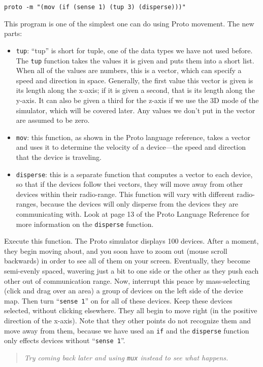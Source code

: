 \documentclass{article}
\newcommand\code[1]{\begin{center}\var{#1}\end{center}}
\newcommand\problem[1]{\begin{quote}{\em #1}\end{quote}}
\newcommand\var[1]{{\tt #1}}
\newcommand\qvar[1]{``{\tt #1}''}
\begin{document}
\code{proto -m "(mov (if (sense 1) (tup 3) (disperse)))"}

This program is one of the simplest one can do using Proto
movement. The new parts:
\begin{itemize}
\item \var{tup}: ``tup'' is short for tuple, one of the data types we
  have not used before.  The \var{tup} function takes the values it is
  given and puts them into a short list.  When all of the values are
  numbers, this is a vector, which can specify a speed and
  direction in space.  Generally, the first value this vector is given
  is its length along the x-axis; if it is given a second, that is its
  length along the y-axis.  It can also be given a third for the
  z-axis if we use the 3D mode of the simulator, which will be covered
  later.  Any values we don't put in the vector are assumed to be
  zero.
\item \var{mov}: this function, as shown in the Proto language
  reference, takes a vector and uses it to determine the velocity of a
  device---the speed and direction that the device is traveling.
\item \var{disperse}: this is a separate function that computes a
  vector to each device, so that if the devices follow thei vectors,
  they will move away from other devices within their radio-range.
  This function will vary with different radio-ranges, because the
  devices will only disperse from the devices they are communicating
  with.  Look at page 13 of the Proto Language Reference for more
  information on the \var{disperse} function.
\end{itemize}

Execute this function.  The Proto simulator displays 100 devices.
After a moment, they begin moving about, and you soon have to zoom out
(mouse scroll backwards) in order to see all of them on your screen.
Eventually, they become semi-evenly spaced, wavering just a bit to one
side or the other as they push each other out of communication range.
Now, interrupt this peace by mass-selecting (click and drag over an
area) a group of devices on the left side of the device map.  Then
turn \qvar{sense 1} on for all of these devices.  Keep these devices
selected, without clicking elsewhere.  They all begin to move right
(in the positive direction of the x-axis).  Note that they other
points do not recognize them and move away from them, because we have
used an \var{if} and the \var{disperse} function only effects devices
without \qvar{sense 1}.  \problem{Try coming back later and using \var{mux}
instead to see what happens.}
\end{document}
